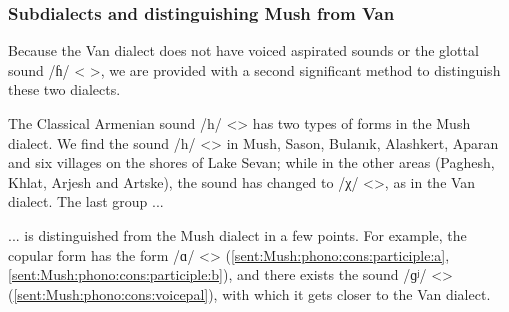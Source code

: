 \begin{table}[H]
	\centering
	\caption{Insertion of word-initial voiced glottal fricative /ɦ/ <> in the Mush dialect}
	\label{tab:Mush:phono:cons:voice:initialH}
\end{table}

\subsubsection{Subdialects and distinguishing Mush from Van}

Because the Van dialect does not have voiced aspirated sounds or the glottal sound /ɦ/ < >, we are provided with a second significant method to distinguish these two dialects. 

The Classical Armenian sound /h/ <> has two types of forms in the Mush dialect. We find the sound /h/ <> in Mush, Sason, Bulanık, Alashkert, Aparan and six villages on the shores of Lake Sevan; while in the other areas (Paghesh, Khlat, Arjesh and Artske), the sound has changed to /χ/ <>, as in the Van dialect. The last group ... 

\begin{adjarianpage}\label{page:118}\end{adjarianpage}%

... is distinguished from the Mush dialect in a few points. For example, the copular form has the form /ɑ/ <> (\ref{sent:Mush:phono:cons:participle:a}, \ref{sent:Mush:phono:cons:participle:b}), and there exists the sound /ɡʲ/ <> (\ref{sent:Mush:phono:cons:voicepal}), with which it gets closer to the Van dialect. 


